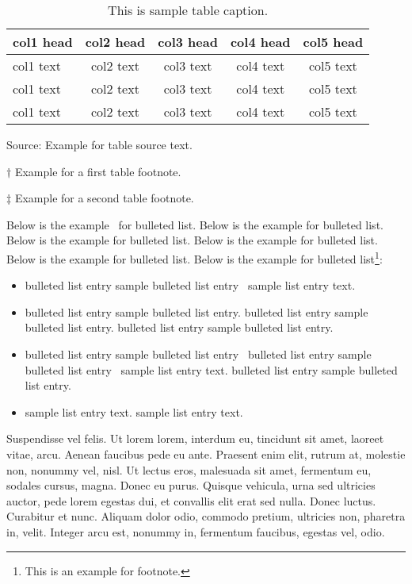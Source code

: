 \documentclass[AMS,STIX1COL]{WileyNJD-v2}
\begin{document}
\begin{center}
\begin{table}[t]%
\centering
\caption{This is sample table caption.\label{tab2}}%
\begin{tabular*}{500pt}{@{\extracolsep\fill}lcccc@{\extracolsep\fill}}
\toprule
\textbf{col1 head} & \textbf{col2 head}  & \textbf{col3 head}  & \textbf{col4 head}  & \textbf{col5 head} \\
\midrule
col1 text & col2 text  & col3 text  & col4 text  & col5 text\tnote{$\dagger$}   \\
col1 text & col2 text  & col3 text  & col4 text  & col5 text   \\
col1 text & col2 text  & col3 text  & col4 text  & col5 text\tnote{$\ddagger$}   \\
\bottomrule
\end{tabular*}
\begin{tablenotes}
\item Source: Example for table source text.
\item[$\dagger$] Example for a first table footnote.
\item[$\ddagger$] Example for a second table footnote.
\end{tablenotes}
\end{table}
\end{center}



Below is the example~\cite{Rothermel1998,Yoo2007,Schulz2012} for bulleted list. Below is the example for bulleted list. Below is the example for bulleted list. Below is the example for bulleted list. Below is the example for bulleted list. Below is the example for bulleted list\footnote{This is an example for footnote.}:
\begin{itemize}
\item bulleted list entry sample bulleted list entry~\cite{Allen2011} sample list entry text. 
\item bulleted list entry sample bulleted list entry. bulleted list entry sample bulleted list entry. bulleted list entry sample bulleted list entry.
\item bulleted list entry sample bulleted list entry~\cite{Ballen2011} bulleted list entry sample bulleted list entry~\citet{Allen2011} sample list entry text.  bulleted list entry sample bulleted list entry.
\item sample list entry text. sample list entry text.  
\end{itemize}

Suspendisse vel felis. Ut lorem lorem, interdum eu, tincidunt sit amet, laoreet vitae, arcu. Aenean faucibus pede eu
ante. Praesent enim elit, rutrum at, molestie non, nonummy vel, nisl. Ut lectus eros, malesuada sit amet, fermentum
eu, sodales cursus, magna. Donec eu purus. Quisque vehicula, urna sed ultricies auctor, pede lorem egestas dui, et
convallis elit erat sed nulla. Donec luctus. Curabitur et nunc. Aliquam dolor odio, commodo pretium, ultricies non,
pharetra in, velit. Integer arcu est, nonummy in, fermentum faucibus, egestas vel, odio.
\end{document}
